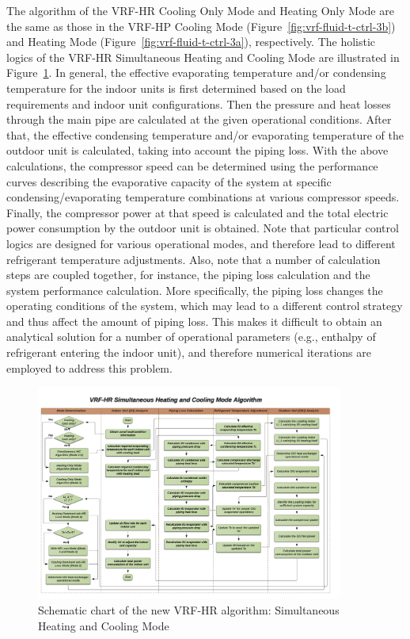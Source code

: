 The algorithm of the VRF-HR Cooling Only Mode and Heating Only Mode are the same as those in the VRF-HP Cooling Mode (Figure~\ref{fig:vrf-fluid-t-ctrl-3b}) and Heating Mode (Figure~\ref{fig:vrf-fluid-t-ctrl-3a}), respectively. The holistic logics of the VRF-HR Simultaneous Heating and Cooling Mode are illustrated in Figure~\ref{fig:VRF-HR-AlgorithmOverview-Mode2-5}. In general, the effective evaporating temperature and/or condensing temperature for the indoor units is first determined based on the load requirements and indoor unit configurations. Then the pressure and heat losses through the main pipe are calculated at the given operational conditions. After that, the effective condensing temperature and/or evaporating temperature of the outdoor unit is calculated, taking into account the piping loss. With the above calculations, the compressor speed can be determined using the performance curves describing the evaporative capacity of the system at specific condensing/evaporating temperature combinations at various compressor speeds. Finally, the compressor power at that speed is calculated and the total electric power consumption by the outdoor unit is obtained. Note that particular control logics are designed for various operational modes, and therefore lead to different refrigerant temperature adjustments. Also, note that a number of calculation steps are coupled together, for instance, the piping loss calculation and the system performance calculation. More specifically, the piping loss changes the operating conditions of the system, which may lead to a different control strategy and thus affect the amount of piping loss. This makes it difficult to obtain an analytical solution for a number of operational parameters (e.g., enthalpy of refrigerant entering the indoor unit), and therefore numerical iterations are employed to address this problem.

\begin{figure}[hbtp] %
\centering
\includegraphics[width=0.9\textwidth, height=0.9\textheight, keepaspectratio=true]{media/VRF-HR-AlgorithmOverview-Mode2-5.png}
\caption{Schematic chart of the new VRF-HR algorithm: Simultaneous Heating and Cooling Mode \label{fig:VRF-HR-AlgorithmOverview-Mode2-5}}
\end{figure}

